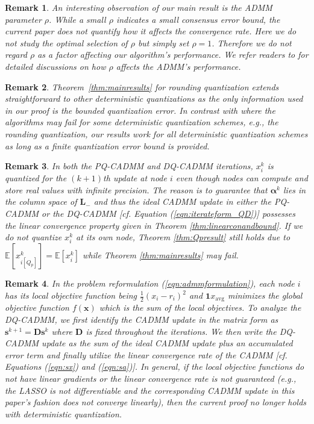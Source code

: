 \documentclass[journal]{IEEEtran}
\newtheorem{remark}{Remark}
\begin{document}
\begin{remark} 
\label{rmk:rho}
An interesting observation of our main result is the ADMM parameter $\rho$. While a small $\rho$ indicates a small consensus error bound, the current paper does not quantify how it affects the convergence rate. Here we do not study the optimal selection of $\rho$ but simply set $\rho=1$. Therefore we do not regard $\rho$ as a factor affecting our algorithm's performance. We refer readers to \cite{BoydADMM,Shi2014,Ghadimi2015ParaSel} for detailed discussions on how $\rho$ affects the ADMM's performance.  
\end{remark}
\begin{remark}
Theorem~\ref{thm:mainresults} for rounding quantization extends straightforward to other deterministic quantizations as the only information used in our proof is the bounded quantization error. In contrast with \cite{Kashyap2007,Nedic2009} where the algorithms may fail for some deterministic quantization schemes, e.g., the rounding quantization, our results work for all deterministic quantization schemes as long as a finite quantization error bound is provided. 
\end{remark}
\begin{remark}
\label{rmk:Qitself}
In both the PQ-CADMM and DQ-CADMM iterations, $x^k_i$ is quantized for the $(k+1)$th update at node $i$ even though nodes can compute and store real values with infinite precision. The reason is to guarantee that $\bm\alpha^k$ lies in the column space of $\bm L_-$ and thus the ideal CADMM update in either the PQ-CADMM or the DQ-CADMM [cf. Equation (\ref{eqn:iterateform_QD})] possesses the linear convergence property given in Theorem \ref{thm:linearconandbound}. If we do not quantize $x^k_i$ at its own node, Theorem \ref{thm:Qpresult} still holds due to $\mathbb{E}[x^k_{i[Q_p]}] = \mathbb{E}[x_i^k]$ while Theorem \ref{thm:mainresults} may fail.
\end{remark}
\begin{remark}
In the problem reformulation (\ref{eqn:admmformulation}), each node $i$ has its local objective function being $\frac{1}{2}(x_i-r_i)^2$ and $\bm1x_\text{avg}$ minimizes the global objective function $f(\bm x)$ which is the sum of the local objectives. To analyze the DQ-CADMM, we first identify the CADMM update in the matrix form as $\bm s^{k+1}=\bm D\bm s^k$ where $\bm D$ is fixed throughout the iterations. We then write the DQ-CADMM update as the sum of the ideal CADMM update plus an accumulated error term and finally utilize the linear convergence rate of the CADMM [cf. Equations (\ref{eqn:sx}) and (\ref{eqn:sa})]. In general, if the local objective functions do not have linear gradients or the linear convergence rate is not guaranteed (e.g., the LASSO is not differentiable and the corresponding CADMM update in this paper's fashion does not converge linearly), then the current proof no longer holds with deterministic quantization.
\end{remark}
\end{document}
